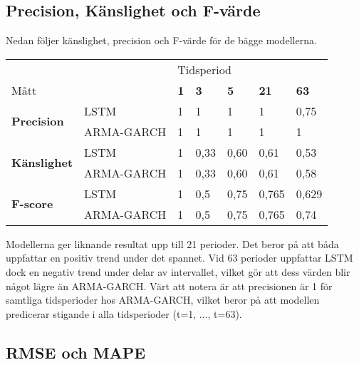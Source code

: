 \documentclass[12pt]{article}
\begin{document}
\subsection{Precision, Känslighet och F-värde}

Nedan följer känslighet, precision och F-värde för de bägge modellerna.

\begin{table}[H]
\begin{tabular}{||lllllll||}
\hline
                                     &            & \multicolumn{5}{l||}{Tidsperiod}                                  \\
Mått                                 &            & \textbf{1} & \textbf{3} & \textbf{5} & \textbf{21} & \textbf{63} \\ \hline\hline
\multirow{2}{*}{\textbf{Precision}}  & LSTM       & 1          & 1          & 1          & 1           & 0,75        \\
                                     & ARMA-GARCH & 1          & 1          & 1          & 1           & 1           \\ \cline{2-7} 
\multirow{2}{*}{\textbf{Känslighet}} & LSTM       & 1          & 0,33       & 0,60       & 0,61        & 0,53        \\
                                     & ARMA-GARCH & 1          & 0,33       & 0,60       & 0,61        & 0,58        \\ \cline{2-7} 
\multirow{2}{*}{\textbf{F-score}}    & LSTM       & 1          & 0,5        & 0,75       & 0,765       & 0,629       \\
                                     & ARMA-GARCH & 1          & 0,5        & 0,75       & 0,765       & 0,74        \\ \hline
\end{tabular}
\end{table}
Modellerna ger liknande resultat upp till 21 perioder. Det beror på att båda uppfattar en positiv trend under det spannet. Vid 63 perioder uppfattar LSTM dock en negativ trend under delar av intervallet, vilket gör att dess värden blir något lägre än ARMA-GARCH. Värt att notera är att precisionen är 1 för samtliga tidsperioder hos ARMA-GARCH, vilket beror på att modellen predicerar stigande i alla tidsperioder (t=1, ..., t=63).

\subsection{RMSE och MAPE}
\end{document}
